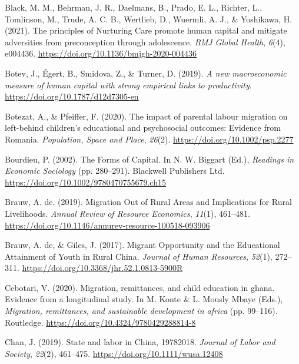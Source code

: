\documentclass[
  man,floatsintext]{apa7}
\newlength{\cslhangindent}
\newlength{\cslentryspacingunit} %
\newenvironment{CSLReferences}[2] %
 {%
  \setlength{\parindent}{0pt}
  \ifodd #1
  \let\oldpar\par
  \def\par{\hangindent=\cslhangindent\oldpar}
  \fi
  \setlength{\parskip}{#2\cslentryspacingunit}
 }%
 {}
\begin{document}
\begin{CSLReferences}{1}{0}
\leavevmode{}%
Black, M. M., Behrman, J. R., Daelmans, B., Prado, E. L., Richter, L., Tomlinson, M., Trude, A. C. B., Wertlieb, D., Wuermli, A. J., \& Yoshikawa, H. (2021). The principles of Nurturing Care promote human capital and mitigate adversities from preconception through adolescence. \emph{BMJ Global Health}, \emph{6}(4), e004436. \url{https://doi.org/10.1136/bmjgh-2020-004436}

\leavevmode{}%
Botev, J., Égert, B., Smidova, Z., \& Turner, D. (2019). \emph{A new macroeconomic measure of human capital with strong empirical links to productivity}. \url{https://doi.org/10.1787/d12d7305-en}

\leavevmode{}%
Botezat, A., \& Pfeiffer, F. (2020). The impact of parental labour migration on left{-}behind children's educational and psychosocial outcomes: Evidence from Romania. \emph{Population, Space and Place}, \emph{26}(2). \url{https://doi.org/10.1002/psp.2277}

\leavevmode{}%
Bourdieu, P. (2002). The Forms of Capital. In N. W. Biggart (Ed.), \emph{Readings in Economic Sociology} (pp. 280--291). Blackwell Publishers Ltd. \url{https://doi.org/10.1002/9780470755679.ch15}

\leavevmode{}%
Brauw, A. de. (2019). Migration Out of Rural Areas and Implications for Rural Livelihoods. \emph{Annual Review of Resource Economics}, \emph{11}(1), 461--481. \url{https://doi.org/10.1146/annurev-resource-100518-093906}

\leavevmode{}%
Brauw, A. de, \& Giles, J. (2017). Migrant Opportunity and the Educational Attainment of Youth in Rural China. \emph{Journal of Human Resources}, \emph{52}(1), 272--311. \url{https://doi.org/10.3368/jhr.52.1.0813-5900R}

\leavevmode{}%
Cebotari, V. (2020). Migration, remittances, and child education in ghana. Evidence from a longitudinal study. In M. Konte \& L. Mously Mbaye (Eds.), \emph{Migration, remittances, and sustainable development in africa} (pp. 99--116). Routledge. \url{https://doi.org/10.4324/9780429288814-8}

\leavevmode{}%
Chan, J. (2019). State and labor in China, 1978{\textendash}2018. \emph{Journal of Labor and Society}, \emph{22}(2), 461--475. \url{https://doi.org/10.1111/wusa.12408}


\end{CSLReferences}
\end{document}
